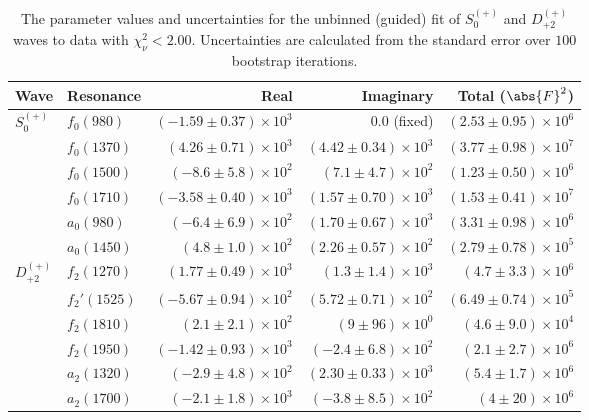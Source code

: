 \begin{table}[ht]
    \begin{center}
        \begin{tabular}{llrrr}\toprule
        Wave & Resonance & Real & Imaginary & Total ($\abs{F}^2$) \\\midrule
$S_{0}^{(+)}$ & $f_{0}(980)$ & $(-1.59 \pm 0.37) \times 10^{3}$ & $0.0$ (fixed) & $(2.53 \pm 0.95) \times 10^{6}$ \\
 & $f_{0}(1370)$ & $(4.26 \pm 0.71) \times 10^{3}$ & $(4.42 \pm 0.34) \times 10^{3}$ & $(3.77 \pm 0.98) \times 10^{7}$ \\
 & $f_{0}(1500)$ & $(-8.6 \pm 5.8) \times 10^{2}$ & $(7.1 \pm 4.7) \times 10^{2}$ & $(1.23 \pm 0.50) \times 10^{6}$ \\
 & $f_{0}(1710)$ & $(-3.58 \pm 0.40) \times 10^{3}$ & $(1.57 \pm 0.70) \times 10^{3}$ & $(1.53 \pm 0.41) \times 10^{7}$ \\
 & $a_{0}(980)$ & $(-6.4 \pm 6.9) \times 10^{2}$ & $(1.70 \pm 0.67) \times 10^{3}$ & $(3.31 \pm 0.98) \times 10^{6}$ \\
 & $a_{0}(1450)$ & $(4.8 \pm 1.0) \times 10^{2}$ & $(2.26 \pm 0.57) \times 10^{2}$ & $(2.79 \pm 0.78) \times 10^{5}$ \\
$D_{+2}^{(+)}$ & $f_{2}(1270)$ & $(1.77 \pm 0.49) \times 10^{3}$ & $(1.3 \pm 1.4) \times 10^{3}$ & $(4.7 \pm 3.3) \times 10^{6}$ \\
 & $f_{2}'(1525)$ & $(-5.67 \pm 0.94) \times 10^{2}$ & $(5.72 \pm 0.71) \times 10^{2}$ & $(6.49 \pm 0.74) \times 10^{5}$ \\
 & $f_{2}(1810)$ & $(2.1 \pm 2.1) \times 10^{2}$ & $(9 \pm 96) \times 10^{0}$ & $(4.6 \pm 9.0) \times 10^{4}$ \\
 & $f_{2}(1950)$ & $(-1.42 \pm 0.93) \times 10^{3}$ & $(-2.4 \pm 6.8) \times 10^{2}$ & $(2.1 \pm 2.7) \times 10^{6}$ \\
 & $a_{2}(1320)$ & $(-2.9 \pm 4.8) \times 10^{2}$ & $(2.30 \pm 0.33) \times 10^{3}$ & $(5.4 \pm 1.7) \times 10^{6}$ \\
 & $a_{2}(1700)$ & $(-2.1 \pm 1.8) \times 10^{3}$ & $(-3.8 \pm 8.5) \times 10^{2}$ & $(4 \pm 20) \times 10^{6}$ \\\bottomrule
        \end{tabular}
    \caption{The parameter values and uncertainties for the unbinned (guided) fit of $S_{0}^{(+)}$ and $D_{+2}^{(+)}$ waves to data with $\chi^2_\nu < 2.00$. Uncertainties are calculated from the standard error over $100$ bootstrap iterations.}\label{tab:unbinned-fit-chisqdof-2.0-guided-Sp0p-Dp2p}
    \end{center}
\end{table}
